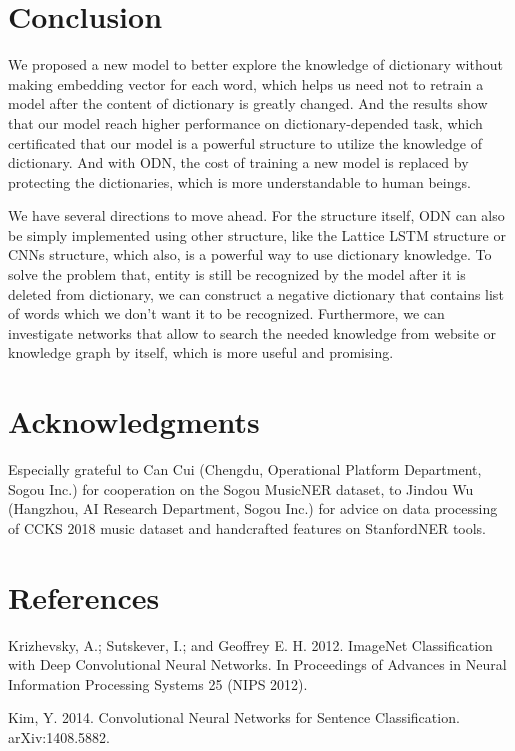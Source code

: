 \documentclass[letterpaper]{article} %
\begin{document}
\section{Conclusion}

We proposed a new model to better explore the knowledge of dictionary without making embedding vector for each word, which helps us need not to retrain a model after the content of dictionary is greatly changed. And the results show that our model reach higher performance on dictionary-depended task, which certificated that our model is a powerful structure to utilize the knowledge of dictionary. And with ODN, the cost of training a new model is replaced by protecting the dictionaries, which is more understandable to human beings.

We have several directions to move ahead. For the structure itself, ODN can also be simply implemented using other structure, like the Lattice LSTM structure or CNNs structure, which also, is a powerful way to use dictionary knowledge. To solve the problem that, entity is still be recognized by the model after it is deleted from dictionary, we can construct a negative dictionary that contains list of words which we don't want it to be recognized. Furthermore, we can investigate networks that allow to search the needed knowledge from website or knowledge graph by itself, which is more useful and promising.

\section{ Acknowledgments }
Especially grateful to Can Cui (Chengdu, Operational Platform Department, Sogou Inc.) for cooperation on the Sogou MusicNER dataset, to Jindou Wu (Hangzhou, AI Research Department, Sogou Inc.) for advice on data processing of CCKS 2018 music dataset and handcrafted features on StanfordNER tools.

\section{References}

\smallskip \noindent
Krizhevsky, A.; Sutskever, I.; and Geoffrey E. H. 2012. ImageNet Classification with Deep Convolutional Neural Networks. In Proceedings of  Advances in Neural Information Processing Systems 25 (NIPS 2012).

\smallskip \noindent
Kim, Y. 2014. Convolutional Neural Networks for Sentence Classification. arXiv:1408.5882.
\end{document}
